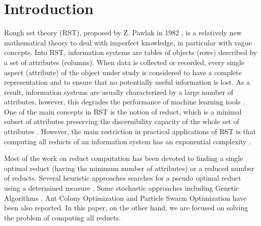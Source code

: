 \documentclass[authoryear,preprint,review,12pt]{elsarticle}
\begin{document}
\section{Introduction}
  Rough set theory (RST), proposed by Z. Pawlak in 1982 \citep{Pawlak81,Pawlak81-2,Pawlak82,Pawlak91}, 
  is a relatively new mathematical theory to deal with imperfect knowledge, in particular with vague 
  concepts. Into RST, information systems are tables of objects (rows) described by a set of attributes (columns). 
  When data is collected or recorded, every single aspect (attribute) of the object under study is considered 
  to have a complete representation and to ensure that no potentially useful information is lost.
  As a result, information systems are usually characterized by a large number of attributes,
  however, this degrades the performance of machine learning tools \citep{Parthalain08}.
  One of the main concepts in RST is the notion of reduct, which is a minimal subset of attributes 
  preserving the discernibility capacity of the whole set of attributes \citep{Pawlak91}.  
  However, the main restriction in practical applications of RST is that computing all reducts of an information 
  system has an exponential complexity \citep{Skowron92}. 
  
  Most of the work on reduct computation has been devoted to finding a single optimal reduct (having the minimum 
  number of attributes) or a reduced number of reducts. Several heuristic approaches searches for a pseudo optimal
  reduct using a determined measure \citep{Zheng14,Liang2014}. Some stochastic approaches including Genetic
  Algorithms \citep{Feng2012,Hedar2015}, Ant Colony Optimization \citep{Jensen03,Chebrolu2015} and Particle Swarm 
  Optimization \citep{Chen15,Luan2015} have been also reported. In this paper, on the other hand, we are focused 
  on solving the problem of computing all reducts.
  
\end{document}
